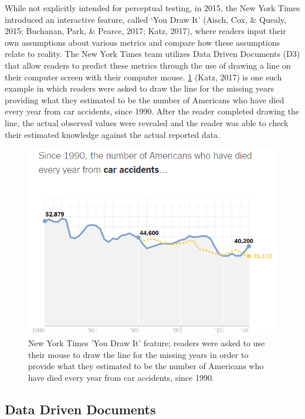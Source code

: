 \documentclass[print]{nuthesis}
\begin{document}
While not explicitly intended for perceptual testing, in 2015, the New York Times introduced an interactive feature, called `You Draw It' (Aisch, Cox, \& Quealy, 2015; Buchanan, Park, \& Pearce, 2017; Katz, 2017), where readers input their own assumptions about various metrics and compare how these assumptions relate to reality.
The New York Times team utilizes Data Driven Documents (D3) that allow readers to predict these metrics through the use of drawing a line on their computer screen with their computer mouse.
\cref{fig:nyt-caraccidents} (Katz, 2017) is one such example in which readers were asked to draw the line for the missing years providing what they estimated to be the number of Americans who have died every year from car accidents, since 1990.
After the reader completed drawing the line, the actual observed values were revealed and the reader was able to check their estimated knowledge against the actual reported data.

\begin{figure}[tbp]

{\centering \includegraphics[width=0.75\linewidth,]{images/02-you-draw-it/nyt-caraccidents-frame4} 

}

\caption[New York Times 'You Draw It' Feature]{New York Times 'You Draw It' feature; readers were asked to use their mouse to draw the line for the missing years in order to provide what they estimated to be the number of Americans who have died every year from car accidents, since 1990.}\label{fig:nyt-caraccidents}
\end{figure}

\hypertarget{data-driven-documents}{%
\subsection{Data Driven Documents}\label{data-driven-documents}}
\end{document}
